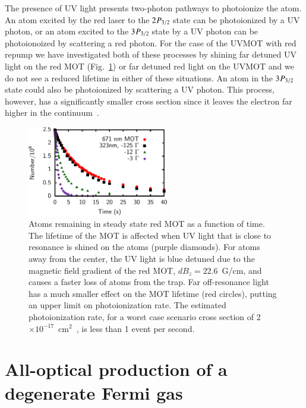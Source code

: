 \documentclass[oneside,12pt]{memoir}
\newcommand{\twop}[1]{\ensuremath{\hspace{-1pt}2\hspace{0.5pt}\hspace{0pt}P_{#1}\hspace{-1pt}}}
\newcommand{\trep}[1]{\ensuremath{\hspace{-1pt}3\hspace{0.5pt}\hspace{0pt}P_{#1}\hspace{-1pt}}}
\begin{document}
The presence of UV light presents two-photon pathways to photoionize the atom.
An atom excited by the red laser to the \twop{3/2} state can be photoionized by
a UV photon, or an atom excited to the \trep{3/2} state by a UV photon can be
photoionoized by scattering a red photon.  For the case of the UVMOT with red
repump we have investigated both of these processes by shining far detuned UV
light on the red MOT (Fig.~\ref{fig:photoion}) or far detuned red light on the
UVMOT and we do not see a reduced lifetime in either of these situations.  An
atom in the \trep{3/2} state could also be photoionized by scattering a UV
photon.  This process, however, has a significantly smaller cross section since
it leaves the electron far higher in the continuum~\cite{Nadeem2011}.
\begin{figure} \centering
\includegraphics[width=0.55\textwidth]{../figures/323mot/photoionization/phioneps.pdf}
\caption[Photoionization with UV light]{\small Atoms remaining in steady state
red MOT as a function of time.  The lifetime of the MOT is affected when UV
light that is close to resonance is shined on the atoms (purple diamonds).  For
atoms away from the center, the UV light is blue detuned due to the magnetic
field gradient of the red MOT, $dB_{z}=22.6$~G/cm, and causes a faster loss of
atoms from the trap.  Far off-resonance light has a much smaller effect on the
MOT lifetime (red circles), putting an upper limit on photoionization rate.
The estimated photoionization rate, for a worst case scenario cross section of
2$\times 10^{-17}$~cm$^{2}$~\cite{Nadeem2011}, is less than 1 event per second.
} \label{fig:photoion} \end{figure}



\chapter{All-optical production of a degenerate Fermi gas} 
\label{ch:alloptical}
\end{document}
